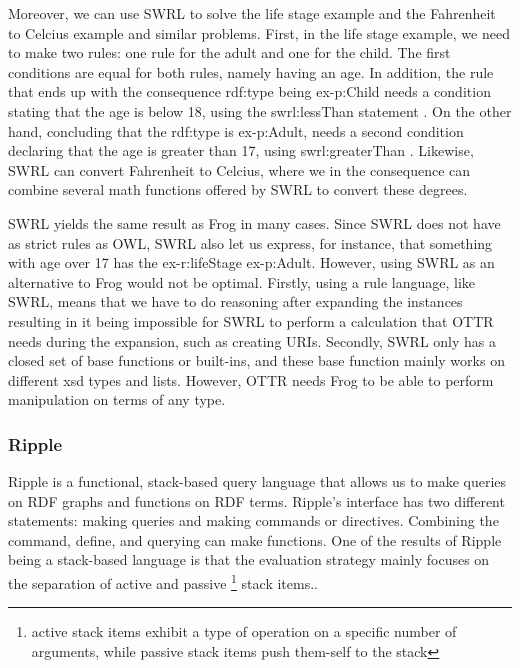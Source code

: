 \para
Moreover, we can use SWRL to solve the life stage example and the Fahrenheit to Celcius example and similar problems. First, in the life stage example, we need to make two rules: one rule for the adult and one for the child. The first conditions are equal for both rules, namely having an age. In addition, the rule that ends up with the consequence rdf:type being ex-p:Child needs a condition stating that the age is below 18, using the swrl:lessThan statement \autocite{SWRL}.  On the other hand, concluding that the rdf:type is ex-p:Adult, needs a second condition declaring that the age is greater than 17, using swrl:greaterThan \autocite{SWRL}. Likewise, SWRL can convert Fahrenheit to Celcius, where we in the consequence can combine several math functions offered by SWRL to convert these degrees.

\para
SWRL yields the same result as Frog in many cases. Since SWRL does not have as strict rules as OWL, SWRL also let us express, for instance, that something with age over 17 has the ex-r:lifeStage ex-p:Adult. However, using SWRL as an alternative to Frog would not be optimal. Firstly, using a rule language, like SWRL, means that we have to do reasoning after expanding the instances resulting in it being impossible for SWRL to perform a calculation that OTTR needs during the expansion, such as creating URIs. Secondly, SWRL only has a closed set of base functions or built-ins, and these base function mainly works on different xsd types and lists. However, OTTR needs Frog to be able to perform manipulation on terms of any type.

\subsubsection{Ripple}
Ripple is a functional, stack-based query language that allows us to make queries on RDF graphs and functions on RDF terms. Ripple's interface has two different statements: making queries and making commands or directives. Combining the command, define, and querying can make functions. One of the results of Ripple being a stack-based language is that the evaluation strategy mainly focuses on the separation of active and passive \footnote{active stack items exhibit a type of operation on a specific number of arguments, while passive stack items push them-self to the stack} stack items.\autocite{ShinavierJoshua_FPLD}.

